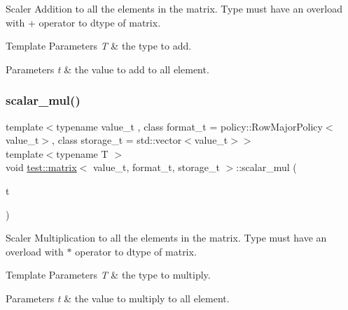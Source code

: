 Scaler Addition to all the elements in the matrix. Type must have an overload with + operator to dtype of matrix. 


\begin{DoxyTemplParams}{Template Parameters}
{\em T} & the type to add. \\
\hline
\end{DoxyTemplParams}

\begin{DoxyParams}{Parameters}
{\em t} & the value to add to all element. \\
\hline
\end{DoxyParams}
\mbox{\label{classtest_1_1matrix_a5c36fb88feb075b3302575914d3de483}} 
\subsubsection{\texorpdfstring{scalar\_mul()}{scalar\_mul()}}
{\footnotesize\ttfamily template$<$typename value\+\_\+t , class format\+\_\+t  = policy\+::\+Row\+Major\+Policy$<$value\+\_\+t$>$, class storage\+\_\+t  = std\+::vector$<$value\+\_\+t$>$$>$ \\
template$<$typename T $>$ \\
void \mbox{\hyperlink{classtest_1_1matrix}{test\+::matrix}}$<$ value\+\_\+t, format\+\_\+t, storage\+\_\+t $>$\+::scalar\+\_\+mul (\begin{DoxyParamCaption}\item[{T}]{t }\end{DoxyParamCaption})\hspace{0.3cm}{\ttfamily [inline]}}



Scaler Multiplication to all the elements in the matrix. Type must have an overload with $\ast$ operator to dtype of matrix. 


\begin{DoxyTemplParams}{Template Parameters}
{\em T} & the type to multiply. \\
\hline
\end{DoxyTemplParams}

\begin{DoxyParams}{Parameters}
{\em t} & the value to multiply to all element. \\
\hline
\end{DoxyParams}
\mbox{\label{classtest_1_1matrix_a65df8dc2b0c24cdc45e6063e9a779784}} 
